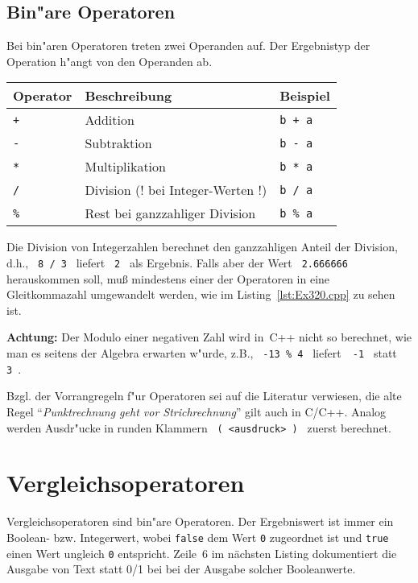 \subsection{Bin"are Operatoren}
\label{p:3.2.2}
%
Bei bin"aren Operatoren treten zwei Operanden auf.
Der Ergebnistyp der Operation h"angt von den Operanden ab.
%

\noindent
\begin{tabular} {l@{\quad}p{}@{\quad}l}
 Operator & Beschreibung & Beispiel \\ \hline
 \verb|+| & Addition & \verb|b + a| \\
 \verb|-| & Subtraktion & \verb|b - a| \\
 \verb|*| & Multiplikation & \verb|b * a| \\
 \verb|/| & Division (! bei Integer-Werten !)& \verb|b / a| \\
 \texttt{\%} & Rest bei ganzzahliger Division& \texttt{b \% a}
\end{tabular}

Die Division von Integerzahlen berechnet den ganzzahligen Anteil
der Division, d.h., \verb| 8 / 3 | liefert \verb| 2 | als Ergebnis.
Falls aber der Wert \verb| 2.666666 | herauskommen soll, mu{\ss}
mindestens einer der Operatoren in eine Gleitkommazahl umgewandelt werden,
wie im Listing~\ref{lst:Ex320.cpp} zu sehen ist.
%

\textbf{Achtung:} Der Modulo einer negativen Zahl wird in~C++ nicht so berechnet, wie man
es seitens der Algebra erwarten w"urde, z.B.,
\verb| -13 % 4 | liefert~\verb| -1 | statt~\verb| 3 |.

Bzgl. der Vorrangregeln f"ur Operatoren sei auf die Literatur verwiesen,
die alte Regel ``\textit{Punktrechnung geht vor Strichrechnung}'' gilt
auch in C/C++. Analog werden Ausdr"ucke in runden Klammern
\verb| ( <ausdruck> ) | zuerst berechnet.
%
%
\section{Vergleichsoperatoren}
\label{p:3.3}
%
Vergleichsoperatoren sind bin"are Operatoren. Der Ergebniswert ist
immer ein Boolean- bzw. Integerwert, wobei \texttt{false} dem Wert \verb|0| zugeordnet ist und
\texttt{true} einen Wert ungleich \verb|0| entspricht.
Zeile~6 im nächsten Listing
dokumentiert die Ausgabe von Text statt 0/1 bei
bei der Ausgabe solcher Booleanwerte.

